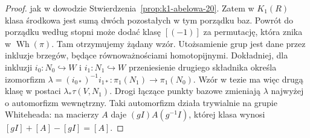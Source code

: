 \begin{proof}
jak w dowodzie Stwierdzenia~\ref{prop:k1-abelowa-20}.
Zatem w
$K_1(R)$ klasa środkowa jest sumą dwóch
pozostałych w tym porządku baz. Powrót do porządku według
stopni może dodać klasę $[(-1)]$ za permutację, która znika
w $\operatorname{Wh}(\pi)$. Tam otrzymujemy żądany wzór.
Utożsamienie grup jest dane
przez inkluzje brzegów, będące równoważnościami
homotopijnymi.
Dokładniej, dla inkluzji $i_0:N_0\hookrightarrow W$
i $i_1:N_1\hookrightarrow W$ przeniesienie drugiego
składnika określa izomorfizm
$\lambda=(i_{0*})^{-1}i_{1*}:\pi_1(N_1)\to\pi_1(N_0)$.
Wzór w tezie ma więc drugą klasę w postaci
$\lambda_*\tau(V,N_1)$. Drogi łączące punkty bazowe
zmieniają $\lambda$ najwyżej o automorfizm wewnętrzny.
Taki automorfizm działa trywialnie na grupie Whiteheada:
na macierzy $A$ daje $(gI)A(g^{-1}I)$, której klasa
wynosi $[gI]+[A]-[gI]=[A]$.
\end{proof}

